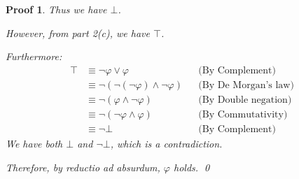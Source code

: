 \documentclass[12pt]{article}
\theoremstyle{proofstyle}
\newtheorem*{proof*}{Proof}
\begin{document}
\begin{enumerate}[left=0pt, itemsep=2em, parsep=1em]
\begin{enumerate}[label=(\alph*), itemsep=1.5em, leftmargin=2em]
\begin{proof*}
    Thus we have $\bot$.
    
    However, from part 2(c), we have $\top$.
    
    Furthermore:
    \begin{align*}
        \top &\equiv \neg \varphi \lor \varphi && \text{(By Complement)} \\
        &\equiv \neg(\neg(\neg\varphi) \land \neg\varphi) && \text{(By De Morgan's law)} \\
        &\equiv \neg(\varphi \land \neg\varphi) && \text{(By Double negation)} \\
        &\equiv \neg(\neg\varphi \land \varphi) && \text{(By Commutativity)} \\
        &\equiv \neg\bot && \text{(By Complement)}
    \end{align*}
    We have both $\bot$ and $\neg\bot$, which is a contradiction.
    
    Therefore, by reductio ad absurdum, $\varphi$ holds. \qed
\end{proof*}

\end{enumerate}

\end{enumerate}
\end{document}
